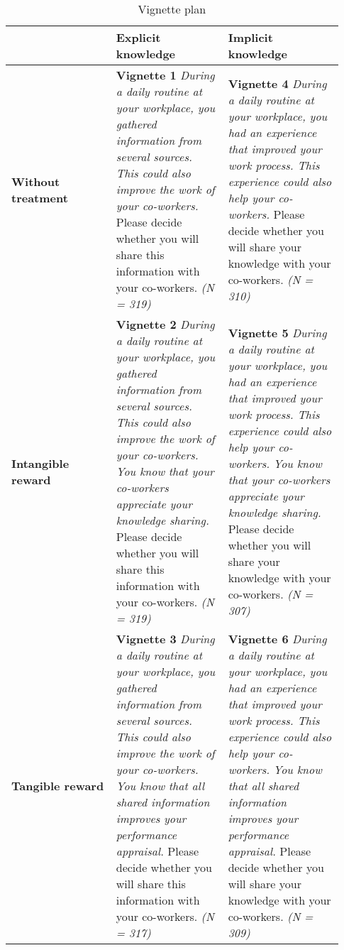 \documentclass[twocolumn, serif, empirical, authordate]{jote-article}
\begin{document}
\begin{table}[h!]\sffamily
\caption{Vignette plan}
\label{tab:table4}
\begin{tabularx}{\linewidth}{>{\raggedright\arraybackslash}p{0.296\linewidth} >{\raggedright\arraybackslash}p{0.3106\linewidth} >{\raggedright\arraybackslash}p{0.3218\linewidth}}
      \textbf{} & \textbf{Explicit knowledge } & \textbf{Implicit knowledge }\\ \toprule
\textbf{Without treatment} & \textbf{Vignette 1 } \textit{During a daily routine at your workplace, you gathered information from several sources. This could also improve the work of your co-workers.}  Please decide whether you will share this information with your co-workers. \textit{(N = 319)} & \textbf{Vignette 4  } \textit{During a daily routine at your workplace, you had an experience that improved your work process. This experience could also help your co-workers.}  Please decide whether you will share your knowledge with your co-workers.  \textit{(N = 310)}\\ 
\textbf{Intangible reward} & \textbf{Vignette 2 } \textit{During a daily routine at your workplace, you gathered information from several sources. This could also improve the work of your co-workers.} \textit{} \textit{You know that your co-workers appreciate your knowledge sharing.} \textit{} Please decide whether you will share this information with your co-workers. \textit{(N = 319)} & \textbf{Vignette 5 } \textit{During a daily routine at your workplace, you had an experience that improved your work process. This experience could also help your co-workers.} \textit{} \textit{You know that your co-workers appreciate your knowledge sharing.} \textit{} Please decide whether you will share your knowledge with your co-workers. \textit{(N = 307)}\\ 
\textbf{Tangible reward} & \textbf{Vignette 3} \textit{During a daily routine at your workplace, you gathered information from several sources. This could also improve the work of your co-workers.} \textit{} \textit{You know that all shared information improves your performance appraisal.}  Please decide whether you will share this information with your co-workers. \textit{(N = 317)} & \textbf{Vignette 6 } \textit{During a daily routine at your workplace, you had an experience that improved your work process. This experience could also help your co-workers.} \textit{} \textit{You know that all shared information improves your performance appraisal.}  Please decide whether you will share your knowledge with your co-workers.  \textit{(N = 309)}
\end{tabularx}

\end{table} 
\end{document}
